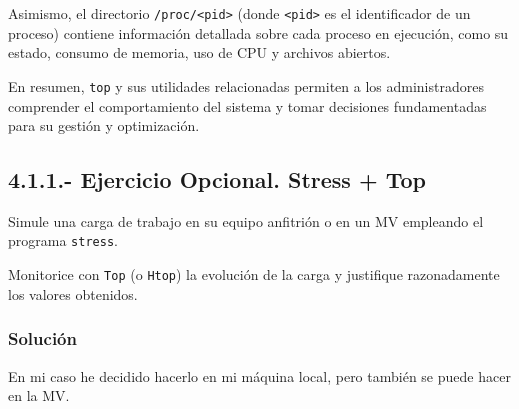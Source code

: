 Asimismo, el directorio \texttt{/proc/<pid>} (donde \texttt{<pid>} es el identificador de un proceso) contiene información detallada sobre cada proceso en ejecución, como su estado, consumo de memoria, uso de CPU y archivos abiertos.

En resumen, \texttt{top} y sus utilidades relacionadas permiten a los administradores comprender el comportamiento del sistema y tomar decisiones fundamentadas para su gestión y optimización.


\subsection{4.1.1.- Ejercicio Opcional. Stress + Top}

Simule una carga de trabajo en su equipo anfitrión o en un MV empleando el programa \texttt{stress}. 

Monitorice con \texttt{Top} (o \texttt{Htop}) la evolución de la carga y justifique razonadamente los valores obtenidos.

\subsubsection*{Solución}

En mi caso he decidido hacerlo en mi máquina local, pero también se puede hacer en la MV.

